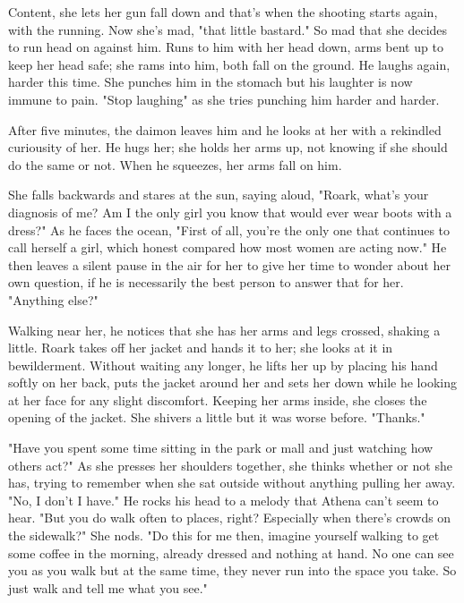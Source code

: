        Content, she lets her gun fall down and that's when the shooting starts again, with the running. Now she's mad, "that little bastard."
    So mad that she decides to run head on against him. Runs to him with her head down, arms bent up to keep her head safe; she rams into him,
    both fall on the ground. He laughs again, harder this time. She punches him in the stomach but his laughter is now immune to pain. "Stop 
    laughing" as she tries punching him harder and harder.

        After five minutes, the daimon leaves him and he looks at her with a rekindled curiousity of her. He hugs her; she holds her arms up,
    not knowing if she should do the same or not. When he squeezes, her arms fall on him.

        She falls backwards and stares at the sun, saying aloud, "Roark, what's your diagnosis of me? Am I the only girl you know that would
    ever wear boots with a dress?" As he faces the ocean, "First of all, you're the only one that continues to call herself a girl, which honest
    compared how most women are acting now." He then leaves a silent pause in the air for her to give her time to wonder about her own question,
    if he is necessarily the best person to answer that for her. "Anything else?"

        Walking near her, he notices that she has her arms and legs crossed, shaking a little. Roark takes off her jacket and hands it to her;
    she looks at it in bewilderment. Without waiting any longer, he lifts her up by placing his hand softly on her back, puts the jacket around
    her and sets her down while he looking at her face for any slight discomfort. Keeping her arms inside, she closes the opening of the jacket.
    She shivers a little but it was worse before. "Thanks."

        "Have you spent some time sitting in the park or mall and just watching how others act?" As she presses her shoulders together, she
    thinks whether or not she has, trying to remember when she sat outside without anything pulling her away. "No, I don't I have." He rocks
    his head to a melody that Athena can't seem to hear. "But you do walk often to places, right? Especially when there's crowds on the sidewalk?"
    She nods. "Do this for me then, imagine yourself walking to get some coffee in the morning, already dressed and nothing at hand. No one can
    see you as you walk but at the same time, they never run into the space you take. So just walk and tell me what you see."

